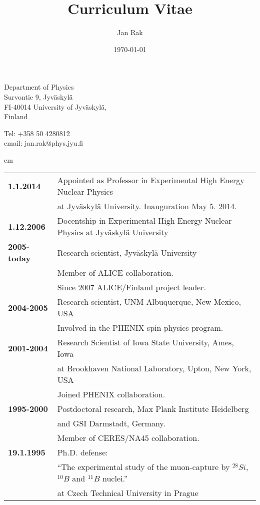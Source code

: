 \documentclass[12pt]{article}
\title{Curriculum Vitae}
\author{Jan Rak}
\date{\today}
\begin{document}
\maketitle

\parbox{7cm}{
Department of Physics\\
Survontie 9, Jyv\"askyl\"a\\
FI-40014 University of Jyv\"askyl\"a,\\ 
Finland}
\hfill
\parbox{5cm}{
Tel: +358 50 4280812\\
email: jan.rak@phys.jyu.fi\\
}

 cm

\noindent
\begin{tabular}{ll}
{\bf 1.1.2014} 		& Appointed as Professor in Experimental High Energy Nuclear Physics\\
				& at  Jyv\"askyl\"a University. Inauguration May 5. 2014. \\
{\bf 1.12.2006} 		& Docentship in Experimental High Energy Nuclear Physics at  Jyv\"askyl\"a University \\
{\bf 2005-today} 	& Research scientist, Jyv\"askyl\"a University \\
				& Member of ALICE collaboration.\\
				& Since 2007 ALICE/Finland project leader.\\
{\bf 2004-2005}  	& Research scientist, UNM Albuquerque, New Mexico, USA\\
				& Involved in the PHENIX spin physics program.\\
{\bf 2001-2004}  	& Research Scientist of Iowa State University, Ames, Iowa \\  						
				& at Brookhaven National Laboratory, Upton, New York, USA\\
				& Joined PHENIX collaboration. \\%
{\bf 1995-2000} 	& Postdoctoral research, Max Plank Institute Heidelberg\\
				& and GSI Darmstadt, Germany.\\ 
				& Member of CERES/NA45 collaboration. \\%
{\bf 19.1.1995} 		& Ph.D. defense:\\
				& ``The experimental study of the muon-capture by $^{28}Si$, $^{10}B$ and  $^{11}B$ nuclei.''\\
				& at Czech Technical University in Prague\\

\end{tabular}
\end{document}
